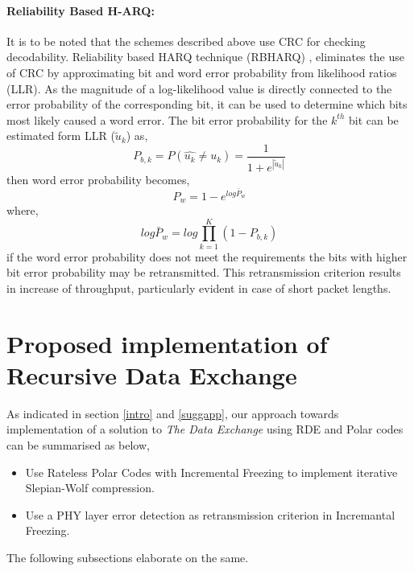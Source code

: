 \documentclass[
11pt, %
a4paper, %
oneside, %
headinclude,footinclude, %
BCOR5mm, %
]{scrartcl}
\begin{document}
\paragraph{Reliability Based H-ARQ:}
It is to be noted that the schemes described above use CRC for checking decodability. Reliability based HARQ technique (RBHARQ) \cite{rbharq}, eliminates the use of CRC by approximating bit and word error probability from likelihood ratios (LLR).  As the magnitude of a log-likelihood value is directly
connected to the error probability of the corresponding
bit, it can be used to determine which bits most
likely caused a word error. The bit error probability for the $k^{th}$ bit can be estimated form LLR ($\tilde{u}_k$) as,
\begin{equation}\label{eq:errorllr}
P_{b,k}=P(\hat{u_k} \neq u_k) = \frac{1}{1+e^{|\tilde{u}_k|}}
\end{equation}
then word error probability becomes, 
\begin{equation}
P_w=1-e^{log\bar{P}_w}
\end{equation}
where, $$log\bar{P}_w=log\prod_{k=1}^K (1- P_{b,k})$$ 
if the word error probability does not meet the requirements the bits with higher bit error probability may be retransmitted. This retransmission criterion results in increase of throughput, particularly evident in case of short packet lengths.



\newpage
\section{Proposed implementation of Recursive Data Exchange} \label{propsol}
As indicated in section \ref{intro} and \ref{suggapp}, our approach towards implementation of a solution to \emph{The Data Exchange} using RDE and Polar codes can be summarised as below, 
\begin{itemize}
\item{Use Rateless Polar Codes with Incremental Freezing to implement iterative Slepian-Wolf compression.}
\item{Use a PHY layer error detection as retransmission criterion in Incremantal Freezing.}
\end{itemize}
The following subsections elaborate on the same.
\end{document}
